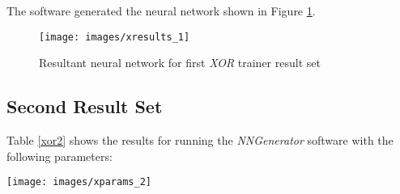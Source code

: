 The software generated the neural network shown in Figure \ref{xresults_1}.

\begin{figure}[h!]
  \centering
  \texttt{[image: images/xresults\_1]}
  \caption{Resultant neural network for first {\it XOR} trainer result set}
  \label{xresults_1}
\end{figure}

\subsection{Second Result Set}

Table \ref{xor2} shows the results for running the {\it NNGenerator}
software with the following parameters: 

\begin{center}
\texttt{[image: images/xparams\_2]}
\end{center}

